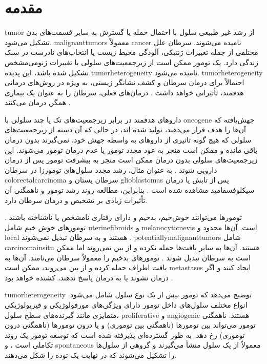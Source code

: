 
\chapter{مقدمه}

\gls{tumor}
از رشد غیر طبیعی سلول با احتمال حمله یا گسترش به سایر قسمت‌های بدن تشکیل می‌شود. \glspl{malignanttumor} معمولاً \gls{cancer} نامیده می‌شوند. سرطان علل مختلفی از جمله تغییرات ژنتیکی، آلودگی محیط زیست یا انتخاب‌های نادرست در سبک زندگی دارد. یک تومور ممکن است از زیرجمعیت‌های سلولی با تغییرات ژنومی‌مشخص تشکیل شده باشد، این پدیده \gls{tumorheterogeneity} نامیده می‌شود. \gls{tumorheterogeneity} احتمالاً برای درمان سرطان و کشف نشانگر زیستی، به ویژه در روش‌های درمانی هدفمند، تأثیراتی خواهد داشت 
\cite{fisher2013cancer}.
درمان‌های فعلی، سرطان را به عنوان یک بیماری همگن درمان می‌کنند
\cite{sun2015intra}.

دارو‌های هدفمند در برابر زیرجمعیت‌های تک یا چند سلولی با \gls{oncogene} جهش‌یافته که آن‌ها را هدف قرار می‌دهند، تولید شده اند، در حالی که آن دسته از زیرجمعیت‌های سلولی که هیچ گونه تاثیری از دارو‌های به واسطه جهش خود، نمی‌گیرند بدون درمان باقی مانده و ممکن است منجر به عود مجدد تومور یا عدم درمان تومور می‌شوند. این زیرجمعیت‌های سلولی بدون درمان ممکن است منجر به پیشرفت تومور پس از درمان دارویی شوند \cite{fisher2013cancer}. به عنوان مثال، رشد مجدد سلول‌های تومورزا در سرطان \gls{colorectalcarcinoma} سرطان پستان و \gls{glioblastomas} پس از تابش یا درمان سیکلوفسفامید مشاهده شده است \cite{sun2015intra}. بنابراین، مطالعه روند رشد تومور و ناهمگنی آن تأثیرات زیادی بر تشخیص و درمان سرطان دارد. 


تومور‌ها می‌توانند خوش‌خیم، بدخیم و دارای رفتاری نامشخص یا ناشناخته باشند \cite{neoplasms}. تومور‌های خوش خیم شامل \glspl{uterinefibroid} و \glspl{melanocyticnevi} است. آن‌ها محدود و \gls{local} هستند و به سرطان تبدیل نمی‌شوند \cite{neoplasia}. \glspl{potentiallymalignanttumor} شامل \gls{carcinomainsitu} هستند. آن‌ها به سایر بافت‌ها حمله نکرده و از بین نمی‌روند اما ممکن است به سرطان تبدیل شوند \cite{canceractivity1}. تومور‌های بدخیم را معمولاً سرطان می‌نامند. آن‌ها به بافت اطراف حمله کرده و از بین می‌روند، ممکن است \gls{metastases} ایجاد کنند و اگر درمان نشوند یا به درمان پاسخ ندهند، کشنده خواهد بود \cite{canceractivity1}. 

\gls{tumorheterogeneity} توضیح می‌دهد که تومور بیش از یک نوع سلول شامل می‌شود. انواع مختلف سلول‌های داخل تومور دارای ویژگی‌های مورفولوژیکی و فیزیولوژیکی متمایزی مانند گیرنده‌های سطح سلول، 
\gls{proliferative}
و 
\gls{angiogenic} هستند. ناهمگنی تومور می‌تواند بین تومور‌ها (ناهمگنی بین توموری) و یا درون تومور‌ها (ناهمگنی درون توموری) رخ دهد. به طور گسترده‌ای پذیرفته شده است که توسعه تومور یک روند تکاملی است \cite{birbrair2014type}، و \gls{spontaneous} معمولاً از یک سلول منشأ می‌گیرند و گروهی از سلول‌ها را تشکیل می‌شوند که در نهایت یک توده را شکل می‌دهند. 

